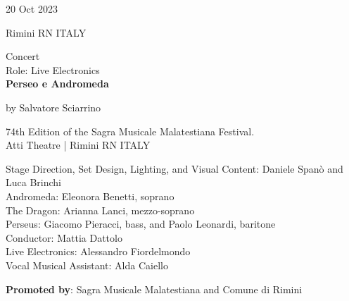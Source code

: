 \documentclass[7pt,a4paper]{article}
\begin{document}
\begin{mdframed}[
    backgroundcolor=white,
    linecolor=white,
    linewidth=0pt,
    innerleftmargin=6pt,
    innerrightmargin=6pt,
    innertopmargin=6pt,
    innerbottommargin=6pt,
    skipabove=0pt,
    skipbelow=0pt
]

\begin{minipage}[t]{0.28\textwidth}

20 Oct 2023

\scriptsize Rimini RN ITALY


\end{minipage}
\begin{minipage}[t]{0.68\textwidth}
\small Concert
\\\scriptsize Role: Live Electronics
\\ \normalsize \textbf{Perseo e Andromeda}
\par\scriptsize by Salvatore Sciarrino

\vspace{0.25cm}



\small 74th Edition of the Sagra Musicale Malatestiana Festival.\\Atti Theatre | \scriptsize Rimini RN ITALY

\vspace{0.1cm}
\scriptsize

Stage Direction, Set Design, Lighting, and Visual Content: Daniele Spanò and Luca Brinchi\\Andromeda: Eleonora Benetti, soprano\\The Dragon: Arianna Lanci, mezzo-soprano\\Perseus: Giacomo Pieracci, bass, and Paolo Leonardi, baritone\\Conductor: Mattia Dattolo\\Live Electronics: Alessandro Fiordelmondo\\Vocal Musical Assistant: Alda Caiello

\vspace{0.1cm}
\par \textbf{Promoted by}: Sagra Musicale Malatestiana and Comune di Rimini
\end{minipage}
\vspace{0.25cm}
\end{mdframed}
\end{document}

